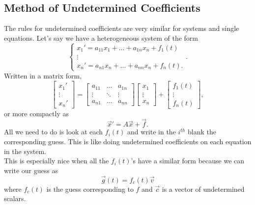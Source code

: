 \subsection{Method of Undetermined Coefficients}
\noindent
The rules for undetermined coefficients are very similar for systems and single equations.
Let's say we have a heterogeneous system of the form
\begin{equation*}
	\begin{cases}
		x_1' = a_{11}x_1 + \ldots + a_{1n}x_n + f_1(t) \\
		\vdots \\
		x_n' = a_{n1}x_n + \ldots + a_{nn}x_n + f_n(t).
	\end{cases}.
\end{equation*}
Written in a matrix form,
\begin{equation*}
	\begin{bmatrix}
		x_1' \\
		\vdots \\
		x_n'
	\end{bmatrix} = \begin{bmatrix}
		a_{11} & \ldots & a_{1n} \\
		\vdots & \ddots & \vdots \\
		a_{n1} & \ldots & a_{nn}
	\end{bmatrix} \begin{bmatrix}
		x_1 \\
		\vdots \\
		x_n
	\end{bmatrix} + \begin{bmatrix}
		f_1(t) \\
		\vdots \\
		f_n(t)
	\end{bmatrix},
\end{equation*}
or more compactly as
\begin{equation*}
	\vec{x}' = A\vec{x} + \vec{f}.
\end{equation*}
All we need to do is look at each $f_i(t)$ and write in the $i^{th}$ blank the corresponding guess.
This is like doing undetermined coefficients on each equation in the system.\\

\noindent
This is especially nice when all the $f_i(t)$'s have a similar form because we can write our guess as
\begin{equation*}
	\vec{g}(t) = f_c(t)\vec{v}
\end{equation*}
where $f_c(t)$ is the guess corresponding to $f$ and $\vec{c}$ is a vector of undetermined scalars.


